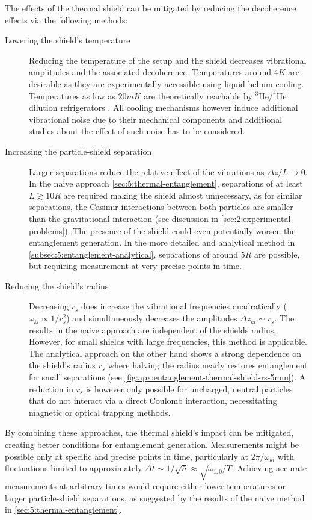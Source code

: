 The effects of the thermal shield can be mitigated by reducing the decoherence effects via the following methods:
\begin{description}
  \item[Lowering the shield's temperature] Reducing the temperature of the setup and the shield decreases vibrational amplitudes and the associated decoherence.
  Temperatures around $4\si{K}$ are desirable as they are experimentally accessible using liquid helium cooling. Temperatures as low as $20\si{mK}$ are theoretically reachable by $^3\mathrm{He}/^4\mathrm{He}$ dilution refrigerators \cite{Das_1965, Zu_2022}. All cooling mechanisms however induce additional vibrational noise due to their mechanical components and additional studies about the effect of such noise has to be considered.

  \item[Increasing the particle-shield separation] Larger separations reduce the relative effect of the vibrations as $\Delta z / L \rightarrow 0$. In the naive approach \cref{sec:5:thermal-entanglement}, separations of at least $L \gtrsim 10 R$ are required making the shield almost unnecessary, as for similar separations, the Casimir interactions between both particles are smaller than the gravitational interaction (see discussion in \cref{sec:2:experimental-problems}). The presence of the shield could even potentially worsen the entanglement generation. In the more detailed and analytical method in \cref{subsec:5:entanglement-analytical}, separations of around $5R$ are possible, but requiring measurement at very precise points in time.
  
  \item[Reducing the shield's radius] Decreasing $r_s$ does increase the vibrational frequencies quadratically ($\omega_{kl} \propto 1/r_s^2$) and simultaneously decreases the amplitudes $\Delta z_{kl} \sim r_s$. The results in the naive approach are independent of the shields radius. However, for small shields with large frequencies, this method is applicable. The analytical approach on the other hand shows a strong dependence on the shield's radius $r_s$ where halving the radius nearly restores entanglement for small separations (see \cref{fig:apx:entanglement-thermal-shield-rs-5mm}). A reduction in $r_s$ is however only possible for uncharged, neutral particles that do not interact via a direct Coulomb interaction, necessitating magnetic or optical trapping methods.
\end{description}
By combining these approaches, the thermal shield's impact can be mitigated, creating better conditions for entanglement generation. Measurements might be possible only at specific and precise points in time, particularly at $2\pi/\omega_{kl}$ with fluctuations limited to approximately $\Delta t \sim 1/\sqrt{\bar{n}} \approx \sqrt{\omega_{1,0} / T}$.
Achieving accurate measurements at arbitrary times would require either lower temperatures or larger particle-shield separations, as suggested by the results of the naive method in \cref{sec:5:thermal-entanglement}.

